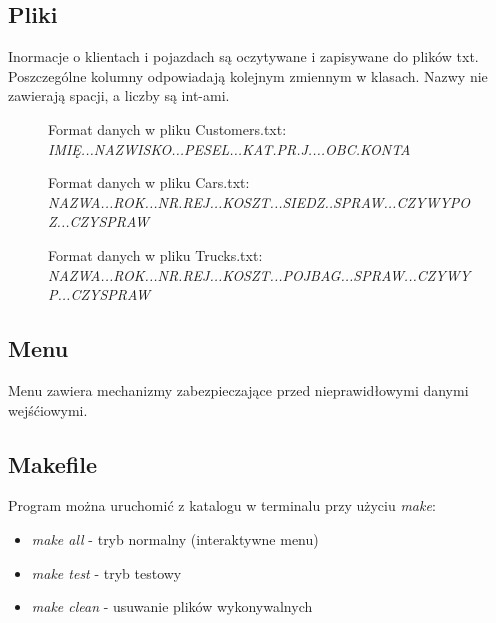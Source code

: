 \documentclass[10pt, a4paper] {article}
\begin{document}
\subsection{Pliki}
Inormacje o klientach i pojazdach są oczytywane i zapisywane do plików txt.
Poszczególne kolumny odpowiadają kolejnym zmiennym w klasach. Nazwy nie zawierają spacji, a liczby są int-ami.

\begin{figure}[H]
	\centering
	\captionsetup{justification=centering}
	\caption{Format danych w pliku Customers.txt:
	{\footnotesize \textit{IMIĘ...NAZWISKO...PESEL...KAT.PR.J....OBC.KONTA}}}
	\label{photo:customers}
\end{figure}

\begin{figure}[H]
	\centering
	\captionsetup{justification=centering}
	\caption{Format danych w pliku Cars.txt:
	{\footnotesize \textit{NAZWA...ROK...NR.REJ...KOSZT...SIEDZ..SPRAW...CZYWYPOZ...CZYSPRAW}}}
	\label{photo:cars}
\end{figure}

\begin{figure}[H]
	\centering
	\captionsetup{justification=centering}
	\caption{Format danych w pliku Trucks.txt:
	{\footnotesize \textit{NAZWA...ROK...NR.REJ...KOSZT...POJBAG...SPRAW...CZYWYP...CZYSPRAW}}}
	\label{photo:trucks}
\end{figure}
\subsection{Menu}
Menu zawiera mechanizmy zabezpieczające przed nieprawidłowymi danymi wejśćiowymi.
\subsection{Makefile}
Program można uruchomić z katalogu w terminalu przy użyciu \textit{make}:
\begin{itemize}
	\item \textit{make all} - tryb normalny (interaktywne menu)
	\item \textit{make test} - tryb testowy
	\item \textit{make clean} - usuwanie plików wykonywalnych
\end{itemize}
\end{document}
